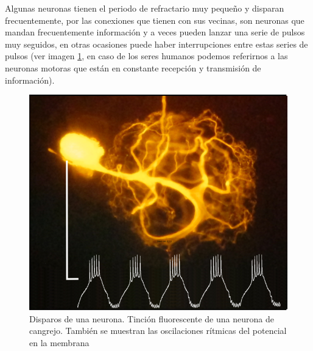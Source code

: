 Algunas neuronas tienen el periodo de refractario muy pequeño y disparan frecuentemente, por las conexiones que tienen con sus vecinas, son neuronas que mandan frecuentemente información y a veces pueden lanzar una serie de pulsos muy seguidos, en
otras ocasiones puede haber interrupciones entre estas series de pulsos (ver imagen \ref{fig:neuronStaining}, en caso de los seres humanos podemos referirnos a las neuronas motoras que están en constante recepción y transmisión de información).

\begin{figure}[h]
 \centering
 \includegraphics[scale=0.7]{../Figuras/neuron_staining_and_recording.png}
 \caption{Disparos de una neurona. Tinción fluorescente de una neurona de cangrejo. También se muestran las oscilaciones
rítmicas del potencial en la membrana}
 \label{fig:neuronStaining}
\end{figure}

